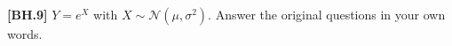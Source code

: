 \begin{exercise}
	\textbf{[BH.9]} $Y=e^X$ with $X \sim \mathcal{N}\left(\mu, \sigma^2\right)$. Answer the original questions in your own words.
\end{exercise}